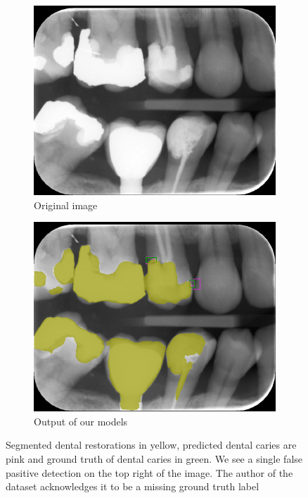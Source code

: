 \begin{figure}[h]
    \centering
    \begin{subfigure}[b]{0.8\textwidth}
        \includegraphics[width=1\linewidth]{images/det2orig.png}
        \caption{Original image}
    \end{subfigure}
    \begin{subfigure}[b]{0.8\textwidth}
        \includegraphics[width=1\linewidth]{images/det2pred.png}
        \caption{Output of our models}
    \end{subfigure}
    \caption{ Segmented dental restorations in yellow, predicted dental caries are pink and ground truth of dental caries in green. We see a single false pasitive detection on the top right of the image. The author of the dataset acknowledges it to be a missing ground truth label}
    \label{fig:both_models_1}
\end{figure}
